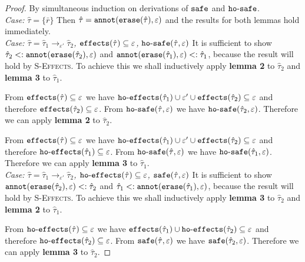 \begin{appendix}
\begin{proof}
By simultaneous induction on derivations of $\mathtt{safe}$ and $\mathtt{ho \hbox{-} safe}$.\\

\textit{Case:} $\hat \tau = \{ \bar r \}$ Then $\hat \tau = \mathtt{annot(erase}(\hat \tau), \varepsilon)$ and the results for both lemmas hold immediately. \\

\textit{Case: $\hat \tau = \hat \tau_1 \rightarrow_{\varepsilon'} \hat \tau_2$, $\mathtt{effects}(\hat \tau) \subseteq \varepsilon$, $\mathtt{ho \hbox{-} safe}(\hat \tau, \varepsilon)$} It is sufficient to show $\hat \tau_2 <: \mathtt{annot(erase}(\hat \tau_2), \varepsilon)$ and $\mathtt{annot(erase}(\hat \tau_1), \varepsilon) <: \hat \tau_1$, because the result will hold by \textsc{S-Effects}. To achieve this we shall inductively apply \textbf{lemma 2} to $\hat \tau_2$ and \textbf{lemma 3} to $\hat \tau_1$. 

From $\mathtt{effects}(\hat \tau) \subseteq \varepsilon$ we have $\mathtt{ho \hbox{-} effects}(\hat \tau_1) \cup \varepsilon' \cup \mathtt{effects}(\hat \tau_2) \subseteq \varepsilon$ and therefore $\mathtt{effects}(\hat \tau_2) \subseteq \varepsilon$. From $\mathtt{ho \hbox{-} safe}(\hat \tau, \varepsilon)$ we have $\mathtt{ho \hbox{-} safe}(\hat \tau_2, \varepsilon)$. Therefore we can apply \textbf{lemma 2} to $\hat \tau_2$.

From $\mathtt{effects}(\hat \tau) \subseteq \varepsilon$ we have $\mathtt{ho \hbox{-} effects}(\hat \tau_1) \cup \varepsilon' \cup \mathtt{effects}(\hat \tau_2) \subseteq \varepsilon$ and therefore $\mathtt{ho \hbox{-} effects}(\hat \tau_1) \subseteq \varepsilon$. From $\mathtt{ho \hbox{-} safe}(\hat \tau, \varepsilon)$ we have $\mathtt{ho \hbox{-} safe}(\hat \tau_1, \varepsilon)$. Therefore we can apply \textbf{lemma 3} to $\hat \tau_1$.\\

\textit{Case: $\hat \tau = \hat \tau_1 \rightarrow_{\varepsilon'} \hat \tau_2$, $\mathtt{ho \hbox{-} effects}(\hat \tau) \subseteq \varepsilon$, $\mathtt{safe}(\hat \tau, \varepsilon)$ } It is sufficient to show $\mathtt{annot(erase}(\hat \tau_2), \varepsilon) <: \hat \tau_2$ and $\hat \tau_1 <: \mathtt{annot(erase}(\hat \tau_1), \varepsilon)$, because the result will hold by \textsc{S-Effects}. To achieve this we shall inductively apply \textbf{lemma 3} to $\hat \tau_2$ and \textbf{lemma 2} to $\hat \tau_1$.

From $\mathtt{ho \hbox{-} effects}(\hat \tau) \subseteq \varepsilon$ we have $\mathtt{effects}(\hat \tau_1) \cup \mathtt{ho \hbox{-} effects}(\hat \tau_2) \subseteq \varepsilon$ and therefore $\mathtt{ho \hbox{-} effects}(\hat \tau_2) \subseteq \varepsilon$. From $\mathtt{safe}(\hat \tau, \varepsilon)$ we have $\mathtt{safe}(\hat \tau_2, \varepsilon)$. Therefore we can apply \textbf{lemma 3} to $\hat \tau_2$.


\end{proof}
\end{appendix}
